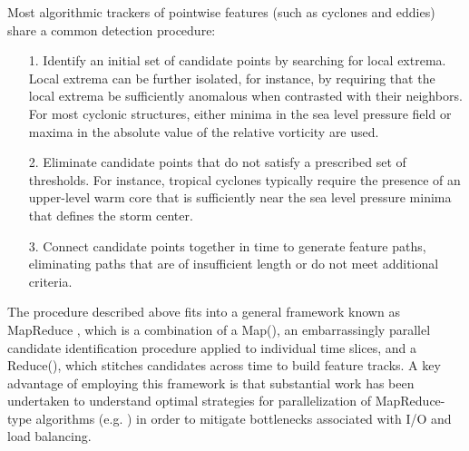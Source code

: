 \documentclass[gmdd, hvmath, online]{copernicus_discussions}
\begin{document}
Most algorithmic trackers of pointwise features (such as cyclones and eddies) share a common detection procedure:
\begin{itemize}
\item[1.] Identify an initial set of candidate points by searching for local extrema.  Local extrema can be further isolated, for instance, by requiring that the local extrema be sufficiently anomalous when contrasted with their neighbors.  For most cyclonic structures, either minima in the sea level pressure field or maxima in the absolute value of the relative vorticity are used.
\item[2.] Eliminate candidate points that do not satisfy a prescribed set of thresholds.  For instance, tropical cyclones typically require the presence of an upper-level warm core that is sufficiently near the sea level pressure minima that defines the storm center.
\item[3.] Connect candidate points together in time to generate feature paths, eliminating paths that are of insufficient length or do not meet additional criteria.
\end{itemize}  The procedure described above fits into a general framework known as MapReduce \citep{dean2008mapreduce}, which is a combination of a Map(), an embarrassingly parallel candidate identification procedure applied to individual time slices, and a Reduce(), which stitches candidates across time to build feature tracks.  A key advantage of employing this framework is that substantial work has been undertaken to understand optimal strategies for parallelization of MapReduce-type algorithms (e.g. \cite{Prabhat2012}) in order to mitigate bottlenecks associated with I/O and load balancing.
\end{document}
